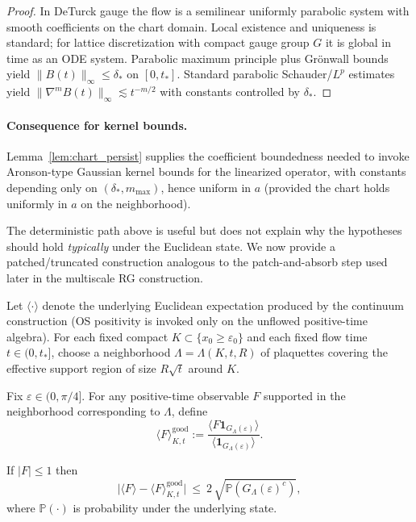 \begin{proof}
In DeTurck gauge the flow is a semilinear uniformly parabolic system with smooth coefficients on the chart domain.
Local existence and uniqueness is standard; for lattice discretization with compact gauge group $G$ it is global in time as an ODE system.
Parabolic maximum principle plus Gr\"onwall bounds yield $\|B(t)\|_\infty\le \delta_\ast$ on $[0,t_\ast]$.
Standard parabolic Schauder/$L^p$ estimates yield $\|\nabla^m B(t)\|_\infty\lesssim t^{-m/2}$ with constants controlled by $\delta_\ast$.
\end{proof}

\paragraph{Consequence for kernel bounds.}
Lemma~\ref{lem:chart_persist} supplies the coefficient boundedness needed to invoke Aronson-type Gaussian kernel bounds for the linearized operator,
with constants depending only on $(\delta_\ast,m_{\max})$, hence uniform in $a$ (provided the chart holds uniformly in $a$ on the neighborhood).

The deterministic path above is useful but does not explain why the hypotheses should hold \emph{typically} under the Euclidean state.
We now provide a patched/truncated construction analogous to the patch-and-absorb step used later in the multiscale RG construction.

Let $\langle\cdot\rangle$ denote the underlying Euclidean expectation produced by the continuum construction (OS positivity is invoked only on the unflowed positive-time algebra).
For each fixed compact $K\subset\{x_0\ge\varepsilon_0\}$ and each fixed flow time $t\in(0,t_\ast]$, choose a neighborhood $\Lambda=\Lambda(K,t,R)$ of plaquettes
covering the effective support region of size $R\sqrt t$ around $K$.

\begin{definition}\label{def:trunc_expect_flow}
Fix $\varepsilon\in(0,\pi/4]$.
For any positive-time observable $F$ supported in the neighborhood corresponding to $\Lambda$, define
\[
\langle F\rangle^{\mathrm{good}}_{K,t}
:=\frac{\langle F\mathbf 1_{G_{\Lambda}(\varepsilon)}\rangle}{\langle \mathbf 1_{G_{\Lambda}(\varepsilon)}\rangle}.
\]
\end{definition}

\begin{lemma}\label{lem:trunc_CS}
If $|F|\le 1$ then
\[
\big|\langle F\rangle-\langle F\rangle^{\mathrm{good}}_{K,t}\big|
\ \le\ 2\,\sqrt{\mathbb P(G_{\Lambda}(\varepsilon)^c)},
\]
where $\mathbb P(\cdot)$ is probability under the underlying state.
\end{lemma}

